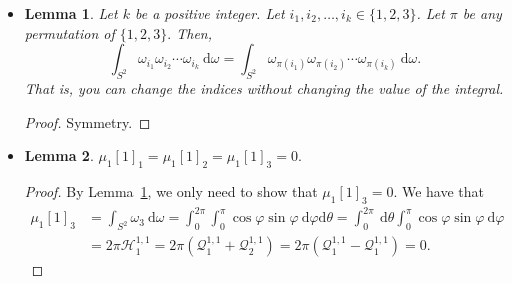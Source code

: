 \documentclass[10pt]{article}
\newtheorem{lemma}{Lemma}[section]
\newcommand{\dee}{\mathrm{d}}
\begin{document}
		\begin{itemize}
			\item \begin{lemma} \label{index-invariant}
				Let $k$ be a positive integer. Let $i_1, i_2, \dotsc, i_k \in \{ 1, 2, 3 \}$.
				Let $\pi$ be any permutation of $\{1, 2, 3\}.$ Then,
				$$\int_{S^2} \omega_{i_1} \omega_{i_2} \dotsm \omega_{i_k}\ \dee \omega = \int_{S^2} \omega_{\pi(i_1)} \omega_{\pi(i_2)} \dotsm \omega_{\pi(i_k)} \ \dee \omega.$$ That is, you can change the indices without changing the value of the integral.
			\end{lemma}
			\begin{proof}
				Symmetry.
			\end{proof}
			
			\item \begin{lemma}
				$\mu_1[1]_1 = \mu_1[1]_2 = \mu_1[1]_3 = 0.$
			\end{lemma}
			\begin{proof}
				By Lemma~\ref{index-invariant}, we only need to show that $\mu_1[1]_3 = 0$. We have that
				\begin{align*}
					\mu_1[1]_3 
					&= \int_{S^2} \omega_3\ \dee\omega 
					= \int_{0}^{2\pi} \int_0^{\pi} \cos \varphi \sin\varphi\ \dee \varphi \dee \theta
					= \int_{0}^{2\pi}\ \dee \theta \int_{0}^{\pi} \cos \varphi \sin\varphi\ \dee\varphi\\
					&= 2\pi \mathcal{H}_1^{1,1} 
					= 2\pi (\mathcal{Q}_1^{1,1} + \mathcal{Q}_2^{1,1})
					= 2\pi (\mathcal{Q}_1^{1,1} - \mathcal{Q}_1^{1,1}) = 0.
				\end{align*}
			\end{proof}
			

\end{itemize}
\end{document}
